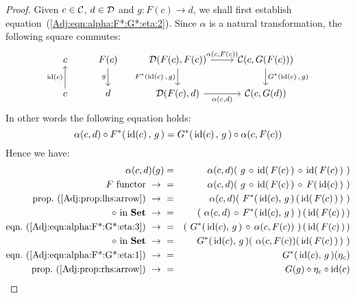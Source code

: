 \noindent
\begin{proof}
    Given $c\in\mbox{$\cal C$}$, $d\in\mbox{$\cal D$}$ and $g:F(c)\to d$, we shall first establish 
    equation~(\ref{Adj:eqn:alpha:F*:G*:eta:2}). Since $\alpha$
    is a natural transformation, the following square commutes:
        \[
            \begin{tikzcd}
                c
                &F(c)\arrow[d,swap, "g"]
                &\Dat(F(c),F(c))\arrow[r, "\alpha\mbox{$(c,F(c))$}"]
                \arrow[d, swap,"F^{*}\mbox{$({\rm id}(c)\,,\,g)$}"]
                &\Cat(c,G(F(c)))
                \arrow[d, "G^{*}\mbox{$({\rm id}(c)\,,\,g)$}"]
                \\
                c\arrow[u, "{\rm id}(c)"]
                &d
                &\Dat(F(c),d)\arrow[r, swap, "\alpha\mbox{$(c,d)$}"]
                &\Cat(c,G(d))
            \end{tikzcd}
        \]
    In other words the following equation holds: 
        \begin{equation}\label{Adj:eqn:alpha:F*:G*:eta:3}
            \alpha(c,d)\circ F^{*}(\,\mbox{\rm id}(c)\,,\,g\,) = 
            G^{*}(\,\mbox{\rm id}(c)\,,\,g\,)\circ\alpha(c,F(c))
        \end{equation}
    Hence we have:
        \begin{eqnarray*}\alpha(c,d)(g)
            &=&\alpha(c,d)(\ g\,\circ\,\id(\,F(c)\,)\,\circ\,\id(\,F(c)\,)\ )\\
            \mbox{$F$ functor}\ \to\ 
            &=&\alpha(c,d)(\ g\,\circ\,\id(\,F(c)\,)\,\circ\,F(\,\id(c)\,)\ )\\
            \mbox{prop.~(\ref{Adj:prop:lhs:arrow})}\ \to\ 
            &=&\alpha(c,d)(\ F^{*}(\,\id(c),\,g\,)\,(\,\id(\,F(c)\,)\,)\ )\\
            \mbox{$\circ$ in \Set}\ \to\ 
            &=&(\ \alpha(c,d)\,\circ\,F^{*}(\,\id(c),\,g\,)\ )\,(\,\id(\,F(c)\,)\,)\\
            \mbox{eqn.~(\ref{Adj:eqn:alpha:F*:G*:eta:3})}\ \to\ 
            &=&(\ G^{*}(\,\id(c),\,g\,)\,\circ\,\alpha(c,F(c))\ )\,(\,\id(\,F(c)\,)\,)\\
            \mbox{$\circ$ in \Set}\ \to\ 
            &=&G^{*}(\,\id(c),\,g\,)(\ \alpha(c,F(c))(\,\id(\,F(c)\,)\,)\ )\\
            \mbox{eqn.~(\ref{Adj:eqn:alpha:F*:G*:eta:1})}\ \to\ 
            &=&G^{*}(\,\id(c),\,g\,)(\eta_{c})\\
            \mbox{prop.~(\ref{Adj:prop:rhs:arrow})}\ \to\ 
            &=&G(g)\circ\eta_{c}\circ\id(c)\\

\end{eqnarray*}
\end{proof}
